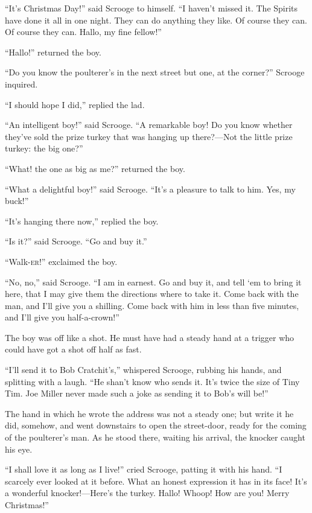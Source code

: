 \documentclass[paper=a5,BCOR=15mm,twoside,DIV=15,headinclude=off,12pt,chapterprefix=off,openany,headings=huge]{scrbook} %
\begin{document}
\enquote{It's Christmas Day!} said Scrooge to himself. \enquote{I haven't missed it. The Spirits have done it all in one night. They can do anything they like. Of course they can. Of course they can. Hallo, my fine fellow!}

\enquote{Hallo!} returned the boy.

\enquote{Do you know the poulterer's in the next street but one, at the corner?} Scrooge inquired.

\enquote{I should hope I did,} replied the lad.

\enquote{An intelligent boy!} said Scrooge. \enquote{A remarkable boy! Do you know whether they've sold the prize turkey that was hanging up there?—Not the little prize turkey: the big one?}

\enquote{What! the one as big as me?} returned the boy.

\enquote{What a delightful boy!} said Scrooge. \enquote{It's a pleasure to talk to him. Yes, my buck!}

\enquote{It's hanging there now,} replied the boy.

\enquote{Is it?} said Scrooge. \enquote{Go and buy it.}

\enquote{Walk-\textsc{er}!} exclaimed the boy.

\enquote{No, no,} said Scrooge. \enquote{I am in earnest. Go and buy it, and tell `em to bring it here, that I may give them the directions where to take it. Come back with the man, and I'll give you a shilling. Come back with him in less than five minutes, and I'll give you half-a-crown!}

The boy was off like a shot. He must have had a steady hand at a trigger who could have got a shot off half as fast.

\enquote{I'll send it to Bob Cratchit's,} whispered Scrooge, rubbing his hands, and splitting with a laugh. \enquote{He shan't know who sends it. It's twice the size of Tiny Tim. Joe Miller never made such a joke as sending it to Bob's will be!}

The hand in which he wrote the address was not a steady one; but write it he did, somehow, and went downstairs to open the street-door, ready for the coming of the poulterer's man. As he stood there, waiting his arrival, the knocker caught his eye.

\enquote{I shall love it as long as I live!} cried Scrooge, patting it with his hand. \enquote{I scarcely ever looked at it before. What an honest expression it has in its face! It's a wonderful knocker!—Here's the turkey. Hallo! Whoop! How are you! Merry Christmas!}
\end{document}

